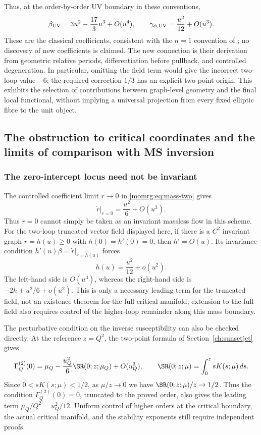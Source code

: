 \documentclass[11pt,a4paper,oneside]{article}
\theoremstyle{plain}
\theoremstyle{definition}
\theoremstyle{remark}
\numberwithin{equation}{section}
\begin{document}
Thus, at the order-by-order UV boundary in these conventions,
\begin{equation}\label{momrg:eq:classical}
 \beta_{\rm UV}=3u^2-\frac{17}{3}u^3+O(u^4),
 \qquad \gamma_{\phi,\rm UV}=\frac{u^2}{12}+O(u^3).
\end{equation}
These are the classical coefficients, consistent with the $n=1$ convention of \cite[Section~II and Eq.~(19)]{kp};
no discovery of new coefficients is claimed.
The new connection is their derivation from geometric relative periods, differentiation before pullback, and controlled degeneration.
In particular, omitting the field term would give the incorrect two-loop value $-6$;
the required correction $1/3$ has an explicit two-point origin.
This exhibits the selection of contributions between graph-level geometry and the final local functional,
without implying a universal projection from every fixed elliptic fibre to the unit object.


\subsection{The obstruction to critical coordinates and the limits of comparison with MS inversion}\label{momrg:sec:critical}
\subsubsection{The zero-intercept locus need not be invariant}
The controlled coefficient limit $r\to0$ in \eqref{momrg:eq:mass-two} gives
\begin{equation}\label{momrg:eq:r-zero}
 \left.\dot r\right|_{r=0}
 =\frac{u^2}{6}+O(u^3).
\end{equation}
Thus $r=0$ cannot simply be taken as an invariant massless flow in this scheme.
For the two-loop truncated vector field displayed here, if there is a $C^2$ invariant graph $r=h(u)\geq0$
with $h(0)=h'(0)=0$, then $h'=O(u)$.
Its invariance condition
$h'(u)\beta=\dot r|_{r=h(u)}$ forces
\begin{equation}\label{momrg:eq:critical-graph}
 h(u)=\frac{u^2}{12}+o(u^2).
\end{equation}
The left-hand side is $O(u^3)$, whereas the right-hand side is $-2h+u^2/6+o(u^2)$.
This is only a necessary leading term for the truncated field, not an existence theorem for the full critical manifold;
extension to the full field also requires control of the higher-loop remainder along this mass boundary.

The perturbative condition on the inverse susceptibility can also be checked directly.
At the reference $z=Q^2$, the two-point formula of Section~\ref{ch:sunsetjet} gives
\[
 \Gamma_Q^{(2)}(0)=\mu_Q-\frac{u_Q^2}{6}\SR(0;z;\mu_Q)+O(u_Q^3),
 \qquad
 \SR(0;z;\mu)=\int_0^z sK(s;\mu)\,ds.
\]
Since $0<sK(s;\mu)<1/2$, as $\mu/z\to0$ we have
$\SR(0;z;\mu)/z\to1/2$.
Thus the condition $\Gamma_Q^{(2)}(0)=0$, truncated to the proved order, also gives
the leading term $\mu_Q/Q^2=u_Q^2/12$.
Uniform control of higher orders at the critical boundary, the actual critical manifold, and the stability exponents still require independent proofs.
\end{document}
